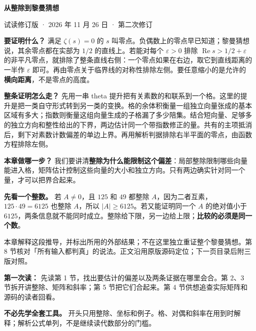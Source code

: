 \documentclass[11pt,a5paper]{article}
\begin{document}
\thispagestyle{empty}
{\sffamily\color{ink}\LARGE\bfseries 从整除到黎曼猜想\par}
\smallskip
{\sffamily\small 试读修订版 · 2026 年 11 月 26 日 · 第二次修订\par}
\medskip

\noindent\textbf{要证明什么？} 满足 $\zeta(s)=0$ 的 $s$ 叫零点。负偶数上的零点早已知道；黎曼猜想说，其余零点都在实部为 $1/2$ 的直线上。若能对每个 $\varepsilon>0$ 排除 $\operatorname{Re}s>1/2+\varepsilon$ 的非平凡零点，就排除了整条直线右侧：一个零点如果在右边，取它到直线距离的一半作 $\varepsilon$ 即可。再由零点关于临界线的对称性排除左侧。要任意缩小的是允许的\textbf{横向距离}，不是零点的高度。

\noindent\textbf{整条证明怎么走？} 先用一串 theta 提升把有关素数的和联系到一个格。这里的提升是把一类自守形式转到另一类的变换。格的余体积衡量一组独立向量张成的基本区域有多大；指数则衡量这组向量生成的子格漏了多少陪集。结合短向量、足够多的独立方向和整性给出的下界，两边估计同一个带指数修正的量。共有的主项抵消后，剩下对素数计数偏差的单边上界。再用解析判据排除右半平面的零点，由函数方程排除左侧。

\noindent\textbf{本章做哪一步？} 我们要讲清\textbf{整除为什么能限制这个偏差}：局部整除限制哪些向量能进入格，矩阵估计控制这些向量的大小和独立方向。只有两边确实针对同一个量，才可以把界合起来。

\noindent\textbf{先看一个整数。} 若 $A\ne0$，且 $125$ 和 $49$ 都整除 $A$，因为二者互素，$125\cdot49=6125$ 也整除 $A$，所以 $|A|\ge6125$。若又能证明同一个 $A$ 的绝对值小于 $6125$，两条信息就不能同时成立。整除给下限，另一边给上限；\textbf{比较的必须是同一个数}。

\vfill
{\small 本章解释这段推导，并标出所用的外部结果；不在这里独立重证整个黎曼猜想。第 8 节核对「所有输入都判真」的说法。正文沿用原版源码定位；下一页目录后附三版对照。\par}
\newpage
\setcounter{tocdepth}{1}
\hypersetup{bookmarksdepth=2}
\tableofcontents
\vspace{0.65cm}
\noindent\textbf{第一次读：} 先读第 1 节，找出要估计的偏差以及两条证据在哪里会合。第 2、3 节拆开讲整除、矩阵和斜率；第 5 节把它们合起来。第 4 节供想追查实际矩阵和源码的读者回看。

\medskip
\noindent\textbf{不必先学全套工具。} 开头只用整除、坐标和例子。格、对偶和斜率在用到时解释；解析公式单列，不是继续读代数部分的门槛。
\newpage







\clearpage

\end{document}
